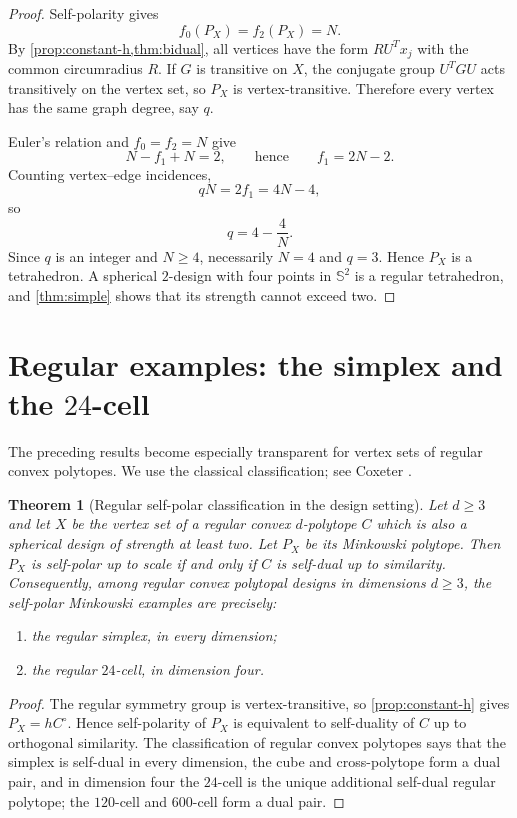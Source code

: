 \documentclass[11pt]{amsart}
\newtheorem{theorem}{Theorem}[section]
\theoremstyle{definition}
\theoremstyle{remark}
\newcommand{\Sph}{\mathbb S}
\begin{document}
\begin{proof}
Self-polarity gives
\[
 f_0(P_X)=f_2(P_X)=N.
\]
By \cref{prop:constant-h,thm:bidual}, all vertices have the form
$RU^Tx_j$ with the common circumradius $R$.  If $G$ is transitive on $X$, the conjugate group $U^TGU$ acts transitively on the vertex set, so $P_X$ is vertex-transitive.  Therefore every vertex has the same graph degree, say $q$.

Euler's relation and $f_0=f_2=N$ give
\[
 N-f_1+N=2,
 \qquad\text{hence}\qquad f_1=2N-2.
\]
Counting vertex--edge incidences,
\[
 qN=2f_1=4N-4,
\]
so
\[
 q=4-\frac4N.
\]
Since $q$ is an integer and $N\ge4$, necessarily $N=4$ and $q=3$.  Hence $P_X$ is a tetrahedron.  A spherical $2$-design with four points in $\Sph^2$ is a regular tetrahedron, and \cref{thm:simple} shows that its strength cannot exceed two.  \qedhere
\end{proof}

\section{Regular examples: the simplex and the $24$-cell}
\label{sec:regular}

The preceding results become especially transparent for vertex sets of regular convex polytopes.  We use the classical classification; see Coxeter \cite{Coxeter1973}.

\begin{theorem}[Regular self-polar classification in the design setting]\label{thm:regularclass}
Let $d\ge3$ and let $X$ be the vertex set of a regular convex $d$-polytope $C$ which is also a spherical design of strength at least two.  Let $P_X$ be its Minkowski polytope.  Then $P_X$ is self-polar up to scale if and only if $C$ is self-dual up to similarity.  Consequently, among regular convex polytopal designs in dimensions $d\ge3$, the self-polar Minkowski examples are precisely:
\begin{enumerate}[label=\textup{(\roman*)}]
\item the regular simplex, in every dimension;
\item the regular $24$-cell, in dimension four.
\end{enumerate}
\end{theorem}

\begin{proof}
The regular symmetry group is vertex-transitive, so \cref{prop:constant-h} gives $P_X=hC^\circ$.  Hence self-polarity of $P_X$ is equivalent to self-duality of $C$ up to orthogonal similarity.  The classification of regular convex polytopes says that the simplex is self-dual in every dimension, the cube and cross-polytope form a dual pair, and in dimension four the $24$-cell is the unique additional self-dual regular polytope; the $120$-cell and $600$-cell form a dual pair.  \qedhere
\end{proof}
\end{document}
